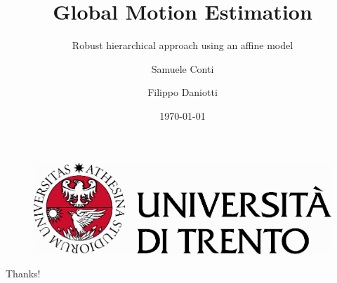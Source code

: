 \documentclass[1610]{beamer}
\author{Samuele Conti \and Filippo Daniotti}
\title{Global Motion Estimation}
\subtitle{Robust hierarchical approach using an affine model}
\institute{DISI, University of Trento}
\date{\today}
\begin{document}
\begin{frame}
    \titlepage
    \begin{figure}[H]
        \begin{center}
            \includegraphics[width=0.4\linewidth]{marchio_unitrento_colore_it_202002.eps}
        \end{center}
    \end{figure}
\end{frame}

\begin{frame}
    \tableofcontents[sectionstyle=show,subsectionstyle=show/shaded/hide,subsubsectionstyle=show/shaded/hide]
\end{frame}




\begin{frame}
    \begin{center}
        {\Huge\calligra Thanks!}
    \end{center}
\end{frame}
\end{document}
